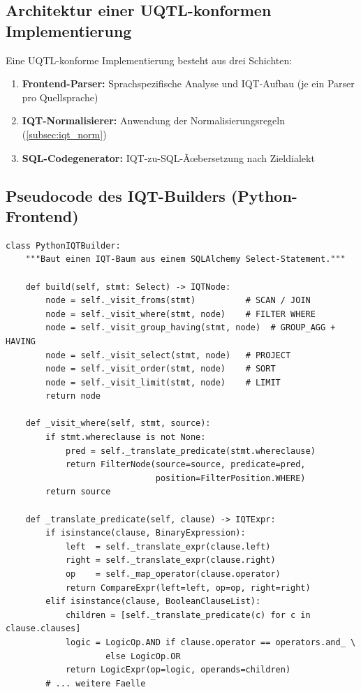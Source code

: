 \subsection{Architektur einer UQTL-konformen Implementierung}
\label{subsec:impl_arch}

Eine UQTL-konforme Implementierung besteht aus drei Schichten:

\begin{enumerate}[leftmargin=1.5cm]
  \item \textbf{Frontend-Parser:} Sprach\-spezifische Analyse und
    IQT-Aufbau (je ein Parser pro Quellsprache)
  \item \textbf{IQT-Normalisierer:} Anwendung der Normalisierungsregeln
    (\ref{subsec:iqt_norm})
  \item \textbf{SQL-Codegenerator:} IQT-zu-SQL-Ãœbersetzung nach Zieldialekt
\end{enumerate}

\subsection{Pseudocode des IQT-Builders (Python-Frontend)}
\label{subsec:impl_py}

\begin{lstlisting}[style=pythonstyle, caption={Python-Frontend: IQT-Builder (vereinfacht)},
  label=lst:impl_py]
class PythonIQTBuilder:
    """Baut einen IQT-Baum aus einem SQLAlchemy Select-Statement."""

    def build(self, stmt: Select) -> IQTNode:
        node = self._visit_froms(stmt)          # SCAN / JOIN
        node = self._visit_where(stmt, node)    # FILTER WHERE
        node = self._visit_group_having(stmt, node)  # GROUP_AGG + HAVING
        node = self._visit_select(stmt, node)   # PROJECT
        node = self._visit_order(stmt, node)    # SORT
        node = self._visit_limit(stmt, node)    # LIMIT
        return node

    def _visit_where(self, stmt, source):
        if stmt.whereclause is not None:
            pred = self._translate_predicate(stmt.whereclause)
            return FilterNode(source=source, predicate=pred,
                              position=FilterPosition.WHERE)
        return source

    def _translate_predicate(self, clause) -> IQTExpr:
        if isinstance(clause, BinaryExpression):
            left  = self._translate_expr(clause.left)
            right = self._translate_expr(clause.right)
            op    = self._map_operator(clause.operator)
            return CompareExpr(left=left, op=op, right=right)
        elif isinstance(clause, BooleanClauseList):
            children = [self._translate_predicate(c) for c in clause.clauses]
            logic = LogicOp.AND if clause.operator == operators.and_ \
                    else LogicOp.OR
            return LogicExpr(op=logic, operands=children)
        # ... weitere Faelle
\end{lstlisting}

